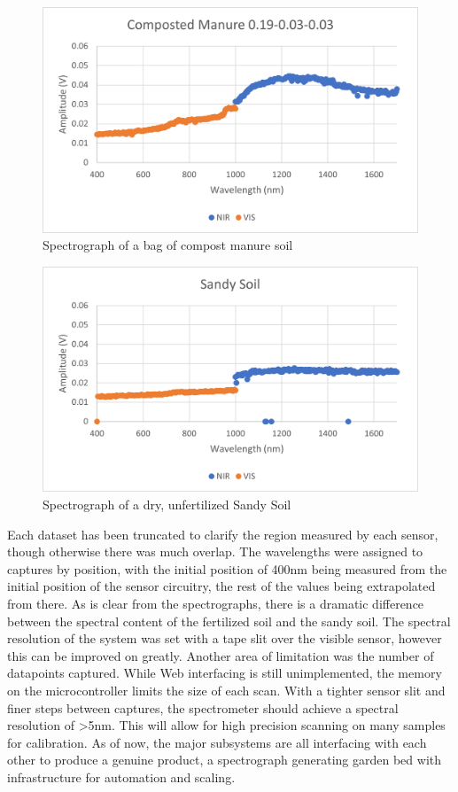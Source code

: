 \documentclass[journal]{IEEEtran}
\begin{document}
\begin{figure}[H]
   \centering
   \label{fig:Data2}
   \includegraphics[scale=0.6]{images/Data2.png}
   \caption{Spectrograph of a bag of compost manure soil}
\end{figure} \begin{figure}[H]
   \centering
   \label{fig:Data3}
   \includegraphics[scale=0.6]{images/Data3.png}
   \caption{Spectrograph of a dry, unfertilized Sandy Soil}
\end{figure}
Each dataset has been truncated to clarify the region measured by each sensor, though otherwise there was much overlap. The wavelengths were assigned to captures by position, with the initial position of 400nm being measured from the initial position of the sensor circuitry, the rest of the values being extrapolated from there. As is clear from the spectrographs, there is a dramatic difference between the spectral content of the fertilized soil and the sandy soil. The spectral resolution of the system was set with a tape slit over the visible sensor, however this can be improved on greatly. Another area of limitation was the number of datapoints captured. While Web interfacing is still unimplemented, the memory on the microcontroller limits the size of each scan. With a tighter sensor slit and finer steps between captures, the spectrometer should achieve a spectral resolution of >5nm. This will allow for high precision scanning on many samples for calibration.
As of now, the major subsystems are all interfacing with each other to produce a genuine product, a spectrograph generating garden bed with infrastructure for automation and scaling.

\end{document}
